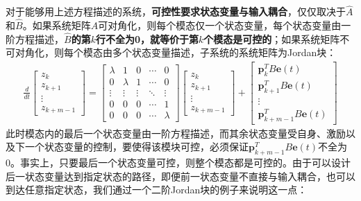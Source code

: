 \documentclass{ctexbook}
\begin{document}
对于能够用上述方程描述的系统，\textbf{可控性要求状态变量与输入耦合}，仅仅取决于$\hat{A}$和$\hat{B}$。如果系统矩阵$A$可对角化，则每个模态仅一个状态变量，每个状态变量由一阶方程描述，\textbf{$\hat{B}$的第$k$行不全为0，就等价于第$k$个模态是可控的}；如果系统矩阵不可对角化，则每个模态由多个状态变量描述，子系统的系统矩阵为Jordan块：
\begin{align*}
    \frac{d}{dt}\begin{bmatrix}
    z_k\\
    z_{k+1}\\
    \vdots\\
    z_{k+m-1}
    \end{bmatrix}=\begin{bmatrix}
    \lambda & 1 & 0 & \cdots & 0\\
    0 & \lambda & 1 & \cdots & 0\\
    \vdots & \vdots & \vdots & \ddots & \vdots\\
    0 & 0 & 0 & \cdots & 1\\
    0 & 0 & 0 & \cdots & \lambda
    \end{bmatrix}\begin{bmatrix}
    z_k\\
    z_{k+1}\\
    \vdots\\
    z_{k+m-1}
    \end{bmatrix}+\begin{bmatrix}
    \mathbf{p}_k^T B\mathbf{e}(t)\\
    \mathbf{p}_{k+1}^T B\mathbf{e}(t)\\
    \vdots\\
    \mathbf{p}_{k+m-1}^T B\mathbf{e}(t)
    \end{bmatrix}
\end{align*}
此时模态内的最后一个状态变量由一阶方程描述，而其余状态变量受自身、激励以及下一个状态变量的控制，要使得该模块可控，必须保证$\mathbf{p}_{k+m-1}^T B\mathbf{e}(t)$不全为0。事实上，只要最后一个状态变量可控，则整个模态都是可控的。由于可以设计后一状态变量达到指定状态的路径，即便前一状态变量不直接与输入耦合，也可以到达任意指定状态，我们通过一个二阶Jordan块的例子来说明这一点：
\end{document}

